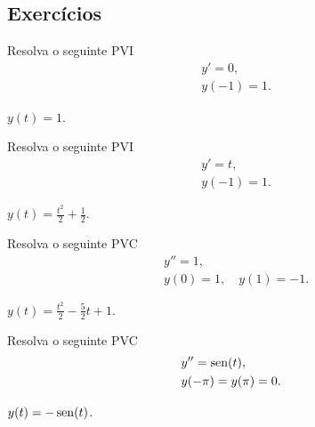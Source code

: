 \subsection*{Exercícios}

\begin{exer}
  Resolva o seguinte PVI
  \begin{align}
    &y' = 0,\\
    &y(-1) = 1.
  \end{align}
\end{exer}
\begin{resp}
  $y(t) = 1$.
\end{resp}

\begin{exer}
  Resolva o seguinte PVI
  \begin{align}
    &y' = t,\\
    &y(-1) = 1.
  \end{align}
\end{exer}
\begin{resp}
  $y(t) = \frac{t^2}{2} + \frac{1}{2}$.
\end{resp}

\begin{exer}
  Resolva o seguinte PVC
  \begin{align}
    &y'' = 1,\\
    &y(0)=1,\quad y(1)=-1.
  \end{align}
\end{exer}
\begin{resp}
  $y(t) = \frac{t^2}{2} - \frac{5}{2}t + 1$.
\end{resp}

\begin{exer}
  Resolva o seguinte PVC
  \begin{align}
    &y'' = \operatorname{sen}(t),\\
    &y(-\pi)=y(\pi)=0.
  \end{align}
\end{exer}
\begin{resp}
  $y(t) = -\operatorname{sen}(t)$.
\end{resp}